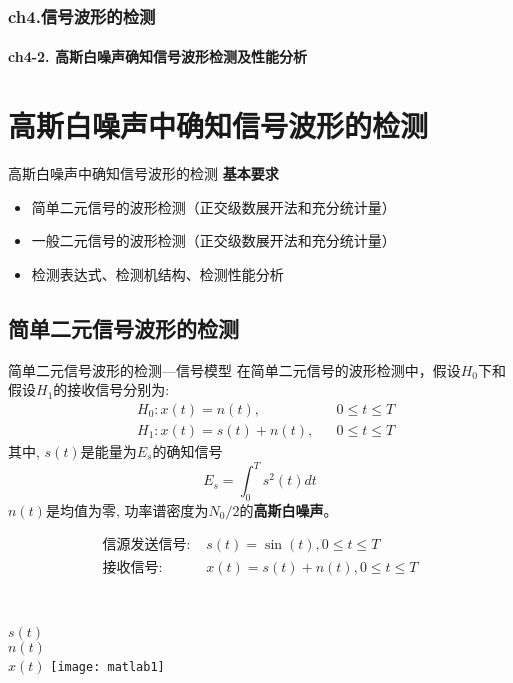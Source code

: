 \begin{frame}[shrink]
  \frametitle{ch4.信号波形的检测}
  \framesubtitle{ch4-2. 高斯白噪声确知信号波形检测及性能分析}
  \tableofcontents[hideallsubsections]
\end{frame}

\section{高斯白噪声中确知信号波形的检测}

\begin{frame}{高斯白噪声中确知信号波形的检测}
\textbf{基本要求}
\vspace{0.5cm}
\begin{itemize}
	\setlength{\itemsep}{.5cm}
	\item 简单二元信号的波形检测（正交级数展开法和充分统计量）
	\item 一般二元信号的波形检测（正交级数展开法和充分统计量）
	\item 检测表达式、检测机结构、检测性能分析
\end{itemize}
\end{frame}

\subsection{简单二元信号波形的检测}

\begin{frame}{简单二元信号波形的检测---信号模型}
在简单二元信号的波形检测中，假设$H_0$下和假设$H_1$的接收信号分别为:
\begin{align*}
&H_0: x(t)=n(t), &&0\le t\le T\\
&H_1: x(t)=s(t)+n(t), &&0\le t\le T
\end{align*}
其中, $s(t)$是能量为$E_s$的确知信号
\[E_s=\int_{0}^{T}s^2(t)dt\]
$n(t)$是均值为零, 功率谱密度为$N_0/2$的\textbf{高斯白噪声}。
\end{frame}

\begin{frame}%
\begin{align*}
\text{信源发送信号: } &s(t)=\sin(t),0 \le t\le T\\
\text{接收信号: } &x(t)=s(t)+n(t), 0\le t\le T
\end{align*}
\begin{columns}%
	~\\
	\vspace{0.2cm}
	$s(t)$\\
	\vspace{0.7cm}
	$n(t)$\\
	\vspace{0.7cm}
	$x(t)$
	\texttt{[image: matlab1]}
\end{columns}
\end{frame}

